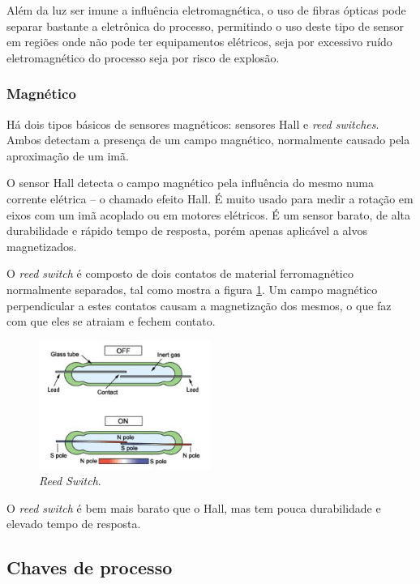 Além da luz ser imune a influência eletromagnética, o uso de fibras ópticas pode separar bastante a eletrônica do processo, permitindo o uso deste tipo de sensor em regiões onde não pode ter equipamentos elétricos, seja por excessivo ruído eletromagnético do processo seja por risco de explosão.

\subsubsection{Magnético}
\label{subs:Magnetico}

Há dois tipos básicos de sensores magnéticos: sensores Hall e \emph{reed switches}. Ambos detectam a presença de um campo magnético, normalmente causado pela aproximação de um imã.

O sensor Hall detecta o campo magnético pela influência do mesmo numa corrente elétrica -- o chamado efeito Hall. É muito usado para medir a rotação em eixos com um imã acoplado ou em motores elétricos. É um sensor barato, de alta durabilidade e rápido tempo de resposta, porém apenas aplicável a alvos magnetizados.

O \emph{reed switch} é composto de dois contatos de material ferromagnético normalmente separados, tal como mostra a figura \ref{fig:reed}. Um campo magnético perpendicular a estes contatos causam a magnetização dos mesmos, o que faz com que eles se atraiam e fechem contato.

\begin{figure}
  \centering
  \includegraphics[width=0.5\textwidth]{figuras/reed}
  \caption{\emph{Reed Switch}.}\label{fig:reed}
\end{figure}

O \emph{reed switch} é bem mais barato que o Hall, mas tem pouca durabilidade e elevado tempo de resposta.

\subsection{Chaves de processo}

